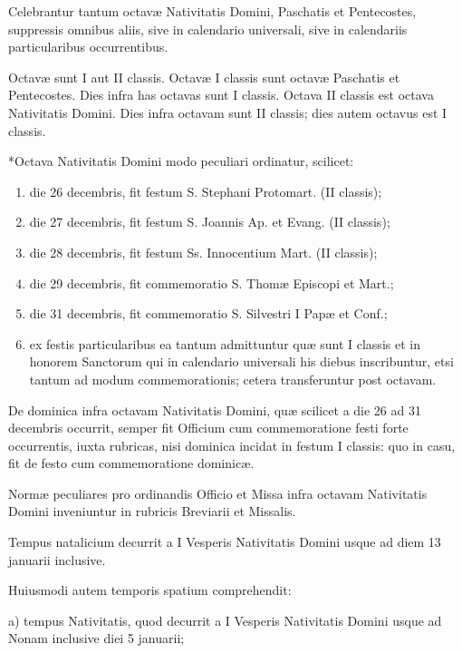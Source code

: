 \documentclass[vesperale_romanum.tex]{subfiles}
\begin{document}
Celebrantur tantum octavæ Nativitatis Domini, Paschatis et Pentecostes, suppressis omnibus aliis, sive in calendario universali, sive in calendariis particularibus occurrentibus. 

Octavæ sunt I aut II classis. Octavæ I classis sunt octavæ Paschatis et Pentecostes. Dies infra has octavas sunt I classis. Octava II classis est octava Nativitatis Domini. Dies infra octavam sunt II classis; dies autem octavus est I classis.

*Octava Nativitatis Domini modo peculiari ordinatur, scilicet:
\begin{enumerate}[nosep,label=\alph*.]
\item die 26 decembris, fit festum S. Stephani Protomart. (II classis);

\item die 27 decembris, fit festum S. Joannis Ap. et Evang. (II classis);

\item die 28 decembris, fit festum Ss. Innocentium Mart. (II classis);

\item die 29 decembris, fit commemoratio S. Thomæ Episcopi et Mart.;

\item die 31 decembris, fit commemoratio S. Silvestri I Papæ et Conf.;

\item ex festis particularibus ea tantum admittuntur quæ sunt I classis et in honorem Sanctorum qui in calendario universali his diebus inscribuntur, etsi tantum ad modum commemorationis; cetera transferuntur post octavam.
\end{enumerate}

De dominica infra octavam Nativitatis Domini, quæ scilicet a die 26 ad 31 decembris occurrit, semper fit Officium cum commemoratione festi forte occurrentis, iuxta rubricas, nisi dominica incidat in festum I classis: quo in casu, fit de festo cum commemoratione dominicæ.

Normæ peculiares pro ordinandis Officio et Missa infra octavam Nativitatis Domini inveniuntur in rubricis Breviarii et Missalis.


Tempus natalicium decurrit a I Vesperis Nativitatis Domini usque ad diem 13 januarii inclusive.

Huiusmodi autem temporis spatium comprehendit:

a) tempus Nativitatis, quod decurrit a I Vesperis Nativitatis Domini usque ad Nonam inclusive diei 5 januarii;
\end{document}
